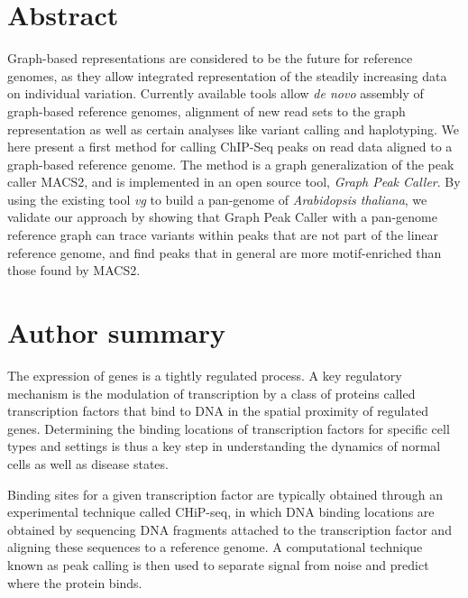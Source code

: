 \documentclass[10pt,letterpaper]{article}
\begin{document}
\section*{Abstract}

Graph-based representations are considered to be the future for reference genomes, as they allow integrated representation of the steadily increasing data on individual variation. Currently available tools allow \emph{de novo} assembly of  graph-based reference genomes, alignment of new read sets to the graph representation as well as certain analyses like variant calling and haplotyping. We here present a first method for calling ChIP-Seq peaks on read data aligned to a graph-based reference genome. The method is a graph generalization of the peak caller MACS2, and is implemented in an open source tool, \emph{Graph Peak Caller}. By using the existing tool \emph{vg} to build a pan-genome of \emph{Arabidopsis thaliana}, we validate our approach by showing that Graph Peak Caller with a pan-genome reference graph can trace variants within peaks that are not part of the linear reference genome, and find peaks that in general are more motif-enriched than those found by MACS2. 

\section*{Author summary}

The expression of genes is a tightly regulated process.
A key regulatory mechanism is the modulation of transcription by a class of proteins called transcription factors that bind to DNA in the spatial proximity of regulated genes.
Determining the binding locations of transcription factors for specific cell types and settings is thus a key step in understanding the dynamics of normal cells as well as disease states.

Binding sites for a given transcription factor are typically obtained through an experimental technique called CHiP-seq, in which DNA binding locations are obtained by sequencing DNA fragments attached to the transcription factor and aligning these sequences to a reference genome.
A computational technique known as peak calling is then used to separate signal from noise and predict where the protein binds.
\end{document}

